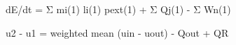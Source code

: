 dE/dt = Σ mi(1) li(1) pext(1) + Σ Qj(1) - Σ Wn(1)  

u2 - u1 = weighted mean (uin - uout) - Qout + QR